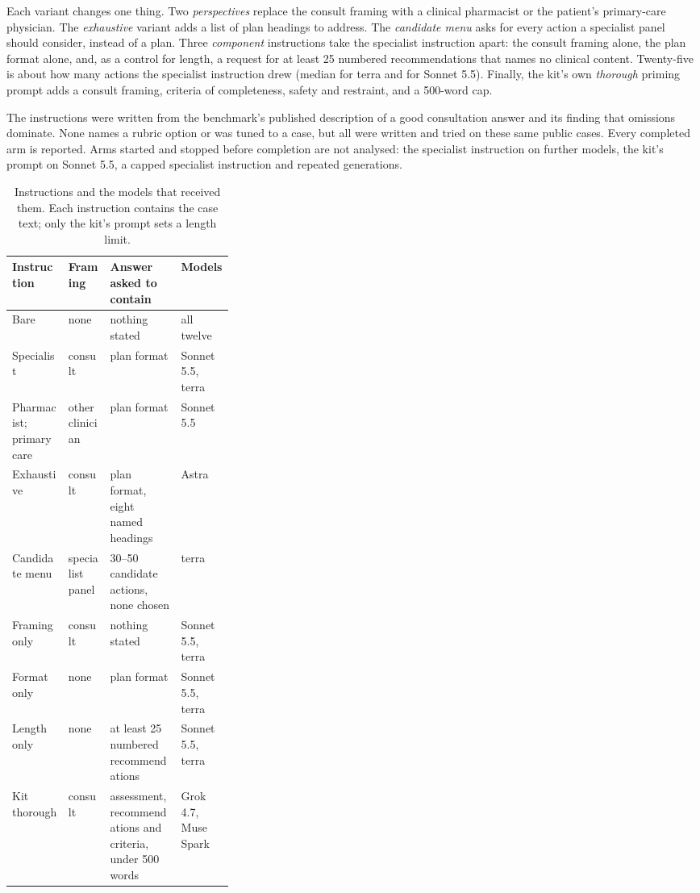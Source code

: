 \documentclass[11pt]{article}
\begin{document}
Each variant changes one thing. Two \emph{perspectives} replace the consult framing with a clinical
pharmacist or the patient's primary-care physician. The \emph{exhaustive} variant adds a list of plan
headings to address. The \emph{candidate menu} asks for every action a specialist panel should
consider, instead of a plan. Three \emph{component} instructions take the specialist instruction
apart: the consult framing alone, the plan format alone, and, as a control for length, a request for
at least 25 numbered recommendations that names no clinical content. Twenty-five is about how many
actions the specialist instruction drew (median \covATerraSpec{} for terra and \covASonnetSpec{} for
Sonnet 5.5). Finally, the kit's own \emph{thorough} priming prompt adds a consult framing, criteria
of completeness, safety and restraint, and a 500-word cap.

The instructions were written from the benchmark's published description of a good consultation
answer and its finding that omissions dominate. None names a rubric option or was tuned to a case,
but all were written and tried on these same public cases. Every completed arm is reported. Arms
started and stopped before completion are not analysed: the specialist instruction on further
models, the kit's prompt on Sonnet 5.5, a capped specialist instruction and repeated generations.

\begin{table}[htbp]
\centering\small
\caption{Instructions and the models that received them. Each instruction contains the case text;
only the kit's prompt sets a length limit.}
\label{tab:instructions}
\setlength{\tabcolsep}{4pt}
\begin{tabular}{llp{0.32\linewidth}l}
\toprule
Instruction & Framing & Answer asked to contain & Models\\
\midrule
Bare & none & nothing stated & all twelve\\
Specialist & consult & plan format & Sonnet 5.5, terra\\
Pharmacist; primary care & other clinician & plan format & Sonnet 5.5\\
Exhaustive & consult & plan format, eight named headings & Astra\\
Candidate menu & specialist panel & 30--50 candidate actions, none chosen & terra\\
Framing only & consult & nothing stated & Sonnet 5.5, terra\\
Format only & none & plan format & Sonnet 5.5, terra\\
Length only & none & at least 25 numbered recommendations & Sonnet 5.5, terra\\
Kit thorough & consult & assessment, recommendations and criteria, under 500 words & Grok 4.7, Muse Spark\\
\bottomrule
\end{tabular}
\end{table}
\end{document}
